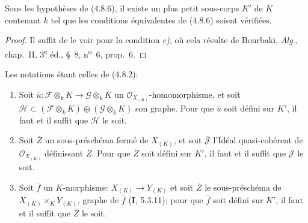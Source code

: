 \begin{corollary}[4.8.7]
\label{IV.2.4.8.7-fr}
Sous les hypothèses de \textup{(4.8.6)}, il existe un plus petit sous-corps $K'$ de $K$
contenant $k$ tel que les conditions équivalentes de \textup{(4.8.6)} soient vérifiées.
\end{corollary}

\begin{proof}
Il suffit de le voir pour la condition \emph{c)}, où cela résulte de Bourbaki,
\emph{Alg.}, chap.~II, 3\textsuperscript{e} éd., \S~8,
n\textsuperscript{o}~6, prop.~6.
\end{proof}

\begin{lemma}[4.8.8]
\label{IV.2.4.8.8-fr}
Les notations étant celles de \textup{(4.8.2)}:
\begin{enumerate}
\item[\textup{(i)}] Soit
$\overline u:\mathscr F\otimes_kK\to\mathscr G\otimes_kK$ un
$\mathcal O_{X_{(K)}}$-homomorphisme, et soit
$\overline{\mathscr H}\subset
(\mathscr F\otimes_kK)\oplus(\mathscr G\otimes_kK)$ son graphe. Pour que
$\overline u$ soit défini sur $K'$, il faut et il suffit que
$\overline{\mathscr H}$ le soit.
\item[\textup{(ii)}] Soit $\overline Z$ un sous-préschéma fermé de $X_{(K)}$, et soit
$\overline{\mathscr J}$ l'Idéal quasi-cohérent de $\mathcal O_{X_{(K)}}$
définissant $\overline Z$. Pour que $\overline Z$ soit défini sur $K'$, il
faut et il suffit que $\overline{\mathscr J}$ le soit.
\item[\textup{(iii)}] Soit $\overline f$ un $K$-morphisme:
$X_{(K)}\to Y_{(K)}$ et soit $\overline Z$ le sous-préschéma de
$X_{(K)}\times_KY_{(K)}$, graphe de $\overline f$ \textup{(\textbf{I}, 5.3.11)}; pour que
$\overline f$ soit défini sur $K'$, il faut et il suffit que $\overline Z$ le
soit.
\end{enumerate}
\end{lemma}

